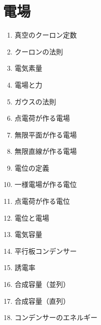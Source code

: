 \documentclass[10pt]{jarticle}
\begin{document}
\addtocounter{page}{-1}
\thispagestyle{empty}
\tableofcontents



\newpage
\addtocounter{page}{-1}
\thispagestyle{empty}
\section{電場}

\begin{enumerate}
\small
\itemsep-4mm
\item 真空のクーロン定数 \\
\item クーロンの法則 \\
\item 電気素量 \\
\item 電場と力 \\
\item ガウスの法則 \\
\item 点電荷が作る電場 \\
\item 無限平面が作る電場 \\
\item 無限直線が作る電場 \\
\item 電位の定義 \\
\end{enumerate}


\newpage
\addtocounter{page}{-1}
\thispagestyle{empty}

\vspace*{-10mm}
\begin{enumerate}
\setcounter{enumi}{9}
\small
\itemsep-4mm
\item 一様電場が作る電位 \\
\item 点電荷が作る電位 \\
\item 電位と電場 \\
\item 電気容量 \\
\item 平行板コンデンサー \\
\item 誘電率 \\
\item 合成容量（並列） \\
\item 合成容量（直列） \\
\item コンデンサーのエネルギー \\
\end{enumerate}
\end{document}
